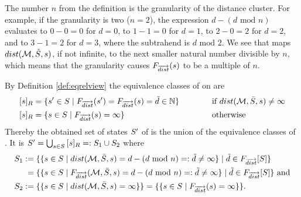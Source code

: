 \documentclass[preview]{standalone}
\begin{document}
The number $n$ from the definition is the granularity of the distance cluster. For example, if the granularity is two ($n = 2$), the expression $d - (d \text { mod } n)$ evaluates to $0 - 0 = 0$ for $d = 0$, to $1 - 1 = 0$ for $d = 1$, to $2 - 0 = 2$ for $d = 2$, and to $3 - 1 = 2$ for $d = 3$, where the subtrahend is $d \text { mod } 2$. We see that \gfctdistance maps ${dist}({{{\mathcal{M}}}},{\tilde{{S}}}, {s})$, if not infinite, to the next smaller natural number divisible by $n$, which means that the granularity causes ${{F_{{\overrightarrow{{dist}}}}}}({s})$ to be a multiple of $n$.

By Definition \ref{def:eqrelview} the equivalence classes of \eqrelview on \states are
\begin{alignat*}{3}
	{\ensuremath{{[{s}]_{{R}}}}} &= \{{s}' \in {S} \mid {\ensuremath{{F_{{\overrightarrow{{dist}}}}}}}({s}') = {{F_{{\overrightarrow{{dist}}}}}}({s}) = \tilde{d} \in {\mathbb{N}}\} \quad\quad\quad &&\text{if } {dist}({{{\mathcal{M}}}}, \bar{{S}}, {s}) \neq \infty \\
	{{[{s}]_{{R}}}} &= \{{s} \in {S} \mid {\ensuremath{{F_{{\overrightarrow{{dist}}}}}}}({s}) = \infty\} &&\text{otherwise } 
\end{alignat*}
Thereby the obtained set of states ${S}'$ of \viewparamvalueseq is the union of the equivalence classes of \eqrelview. It is ${S}' = \bigcup_{{s} \in {S}} {{[{s}]_{{R}}}} =: {S}_1 \cup {S}_2$ where
\begin{align*}
	{S}_1 &:= \{\{{s} \in {S} \mid {dist}({{{\mathcal{M}}}}, \bar{{S}}, {s}) = {d} - ({d} \text{ mod } n) =: \tilde{d} \neq \infty\} \mid \tilde{d} \in {\ensuremath{{F_{{\overrightarrow{{dist}}}}}}}[{S}]\} \\
	&\;= \{\{{s} \in {S} \mid {\ensuremath{{F_{{\overrightarrow{{dist}}}}}}}({{{\mathcal{M}}}}, \bar{{S}}, {s}) = {d} - ({d} \text{ mod } n) =: \tilde{d} \neq \infty\} \mid \tilde{d} \in {\ensuremath{{F_{{\overrightarrow{{dist}}}}}}}[{S}]\} \text{ and}\\
	{S}_2 &:= \{\{{s} \in {S} \mid {dist}({{{\mathcal{M}}}}, \bar{{S}}, {s}) = \infty\}\} = \{\{{s} \in {S} \mid {\ensuremath{{F_{{\overrightarrow{{dist}}}}}}}({s}) = \infty\}\}.
\end{align*}
\end{document}
